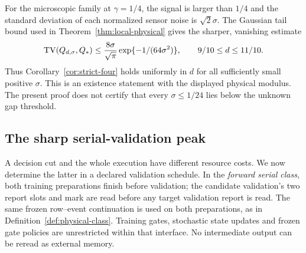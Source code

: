 For the microscopic family at $\gamma=1/4$, the signal is larger than
$1/4$ and the standard deviation of each normalized sensor noise is
$\sqrt2\sigma$. The Gaussian tail bound used in
Theorem~\ref{thm:local-physical} gives the sharper, vanishing estimate
\begin{equation}\label{eq:vanishing-noise}
 \operatorname{TV}(Q_{d,\sigma},Q_*)\le
 \frac{8\sigma}{\sqrt\pi}\exp\{-1/(64\sigma^2)\},
 \qquad 9/10\le d\le11/10.
\end{equation}
Thus Corollary~\ref{cor:strict-four} holds uniformly in $d$ for all
sufficiently small positive $\sigma$. This is an existence statement
with the displayed physical modulus. The present proof does not certify
that every $\sigma\le1/24$ lies below the unknown gap threshold.

\subsection{The sharp serial-validation peak}
A decision cut and the whole execution have different resource costs.
We now determine the latter in a declared validation schedule. In the
\emph{forward serial class}, both training preparations finish before
validation; the candidate validation's two report slots and mark are
read before any target validation report is read. The same frozen
row--event continuation is used on both preparations, as in
Definition~\ref{def:physical-class}. Training gates, stochastic state
updates and frozen gate policies are unrestricted within that interface.
No intermediate output can be reread as external memory.

